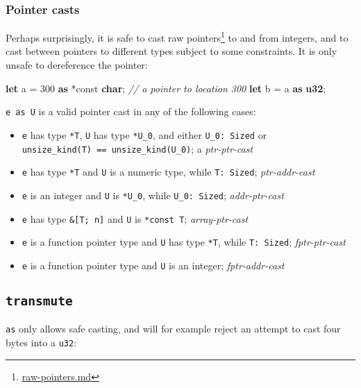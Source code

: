 \documentclass[a4paper,]{book}
\newenvironment{Shaded}{\begin{snugshade}}{\end{snugshade}}
\newcommand{\KeywordTok}[1]{\textcolor[rgb]{0.13,0.29,0.53}{\textbf{{#1}}}}
\newcommand{\DecValTok}[1]{\textcolor[rgb]{0.00,0.00,0.81}{{#1}}}
\newcommand{\CommentTok}[1]{\textcolor[rgb]{0.56,0.35,0.01}{\textit{{#1}}}}
\newcommand{\NormalTok}[1]{{#1}}
\renewcommand{\href}[2]{#2\footnote{\url{#1}}}
\begin{document}
\subsubsection{Pointer casts}\label{pointer-casts}

Perhaps surprisingly, it is safe to cast \href{raw-pointers.md}{raw
pointers} to and from integers, and to cast between pointers to
different types subject to some constraints. It is only unsafe to
dereference the pointer:

\begin{Shaded}
\begin{Highlighting}[]
\KeywordTok{let} \NormalTok{a = }\DecValTok{300} \KeywordTok{as} \NormalTok{*const }\KeywordTok{char}\NormalTok{; }\CommentTok{// a pointer to location 300}
\KeywordTok{let} \NormalTok{b = a }\KeywordTok{as} \KeywordTok{u32}\NormalTok{;}
\end{Highlighting}
\end{Shaded}

\texttt{e\ as\ U} is a valid pointer cast in any of the following cases:

\begin{itemize}
\item
  \texttt{e} has type \texttt{*T}, \texttt{U} has type \texttt{*U\_0},
  and either \texttt{U\_0:\ Sized} or
  \texttt{unsize\_kind(T)\ ==\ unsize\_kind(U\_0)}; a
  \emph{ptr-ptr-cast}
\item
  \texttt{e} has type \texttt{*T} and \texttt{U} is a numeric type,
  while \texttt{T:\ Sized}; \emph{ptr-addr-cast}
\item
  \texttt{e} is an integer and \texttt{U} is \texttt{*U\_0}, while
  \texttt{U\_0:\ Sized}; \emph{addr-ptr-cast}
\item
  \texttt{e} has type \texttt{\&{[}T;\ n{]}} and \texttt{U} is
  \texttt{*const\ T}; \emph{array-ptr-cast}
\item
  \texttt{e} is a function pointer type and \texttt{U} has type
  \texttt{*T}, while \texttt{T:\ Sized}; \emph{fptr-ptr-cast}
\item
  \texttt{e} is a function pointer type and \texttt{U} is an integer;
  \emph{fptr-addr-cast}
\end{itemize}

\subsection{\texorpdfstring{\texttt{transmute}}{transmute}}\label{transmute}

\texttt{as} only allows safe casting, and will for example reject an
attempt to cast four bytes into a \texttt{u32}:
\end{document}

